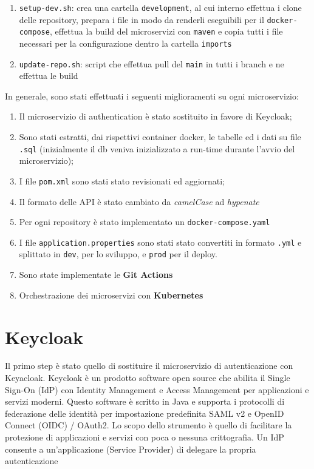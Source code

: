 \documentclass{article}
\begin{document}
\begin{enumerate}
    \item {\texttt{setup-dev.sh}: crea una cartella \texttt{development}, al cui interno effettua i clone delle repository, prepara i file in modo da renderli eseguibili per il \texttt{docker-compose}, effettua la build del microservizi con \texttt{maven} e
        copia tutti i file necessari per la configurazione  dentro la cartella \texttt{imports}}
    \item {\texttt{update-repo.sh}: script che effettua pull del \texttt{main} in tutti i branch e ne effettua le build}
\end{enumerate}

In generale, sono stati effettuati i seguenti miglioramenti su ogni microservizio:

\begin{enumerate}
    \item {Il microservizio di authentication è stato sostituito in favore di Keycloak; }
    \item {Sono stati estratti, dai rispettivi container docker, le tabelle ed i dati su file \texttt{.sql} (inizialmente il db veniva inizializzato a run-time durante l'avvio del microservizio);}
    \item {I file \texttt{pom.xml} sono stati stato revisionati ed aggiornati;}
    \item {Il formato delle API è stato cambiato da \textit{camelCase} ad \textit{hypenate}}
    \item {Per ogni repository è stato implementato un \texttt{docker-compose.yaml}}
    \item {I file \texttt{application.properties} sono stati stato convertiti in formato \texttt{.yml} e splittato in \texttt{dev}, per lo sviluppo, e \texttt{prod} per il deploy.}
    \item {Sono state implementate le \textbf{Git Actions} }
    \item {Orchestrazione dei microservizi con \textbf{Kubernetes}}
\end{enumerate}


\section{Keycloak}

Il primo step è stato quello di sostituire il microservizio di autenticazione con Keyacloak. Keycloak è un
prodotto software open source che abilita il Single Sign-On (IdP) con Identity Management e
Access Management per applicazioni e servizi moderni. Questo software è scritto in Java e
supporta i protocolli di federazione delle identità per impostazione predefinita SAML v2 e
OpenID Connect (OIDC) / OAuth2. Lo scopo dello strumento è quello di facilitare la protezione
di applicazioni e servizi con poca o nessuna crittografia. Un IdP consente a un'applicazione
(Service Provider) di delegare la propria autenticazione %
\end{document}
